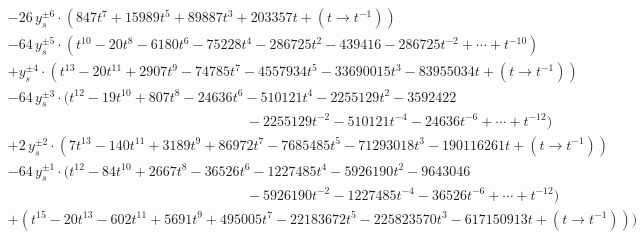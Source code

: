 \documentclass[letterpaper, 11pt]{article}
\newcommand{\nn}{\nonumber}
\begin{document}
{\begin{align}
  &-26\,y_s^{\pm6} \cdot (847 t^7+15989 t^5+89887 t^3+203357
  t+ (t\rightarrow t^{-1}) )\nn\\
  &-64\,y_s^{\pm5}\cdot (t^{10}-20 t^8-6180 t^6-75228 t^4-286725
  t^2-439416-{286725}t^{-2} +\cdots + t^{-10})\nn\\
  &+y_s^{\pm4}\cdot (t^{13}-20 t^{11}+2907 t^9-74785 t^7-4557934 t^5-33690015 t^3-83955034 t +  (t\rightarrow t^{-1}) )\nn\\
  &-64\,y_s^{\pm3}\cdot (t^{12}-19 t^{10}+807 t^8-24636 t^6-510121 t^4-2255129
  t^2-3592422\nn\\
  &\qquad\qquad\qquad\qquad\qquad\qquad\qquad\qquad\quad -{2255129}t^{-2}-510121 t^{-4}-24636 t^{-6} + \cdots + t^{-12})\nn\\
  &+2\,y_s^{\pm2}\cdot (7 t^{13}-140 t^{11}+3189 t^9+86972 t^7-7685485 t^5-71293018 t^3-190116261 t + (t\rightarrow t^{-1}))\nn\\
  &-64\,y_s^{\pm1} \cdot (t^{12}-84 t^{10}+2667 t^8-36526 t^6-1227485 t^4-5926190
  t^2-9643046
    \nn\\
  &\qquad\qquad\qquad\qquad\qquad\qquad\qquad\qquad\quad -{5926190}{t^{-2}}-1227485 t^{-4} -36526 t^{-6}+\cdots + t^{-12})\nn\\
  &+(t^{15}-20 t^{13}-602 t^{11}+5691 t^9+495005 t^7-22183672 t^5-225823570 t^3-617150913t+  (t\rightarrow t^{-1}) )\Big)
  \end{align}

}
\end{document}
